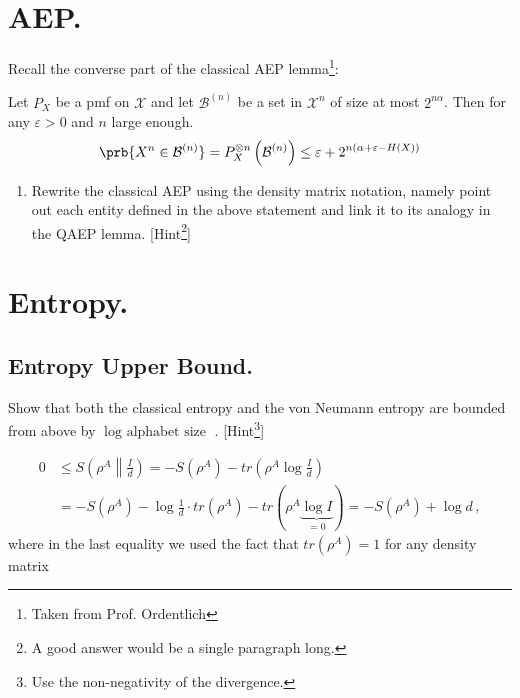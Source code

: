 \documentclass[12pt,a4paper]{article}
\begin{document}
\section{AEP.}
Recall the converse part of the classical AEP lemma\footnote{Taken from Prof. Ordentlich}:
\begin{lemma}
  Let $P_X$ be a pmf on $\mathcal{X}$ and let $\mathcal{B}^{(n)}$ be a set in $\mathcal{X}^n$ of size at most $2^{n\alpha}$. Then for any $\varepsilon > 0$ and $n$ large enough. 
  \begin{equation*}
    \begin{split}
      \prb{X^n \in \mathcal{B}^{(n)}} = P^{\otimes n}_{X}\left( \mathcal{B}^{(n)} \right) \le \varepsilon + 2^{n(\alpha + \varepsilon - H(X))}
    \end{split}
  \end{equation*}
\end{lemma}
\begin{enumerate} 
  \item Rewrite the classical AEP using the density matrix notation, namely point out each entity defined in the above statement and link it to its analogy in the QAEP lemma. [Hint\footnote{A good answer would be a single paragraph long.}]
\end{enumerate}


\section{Entropy.}

\subsection{Entropy Upper Bound. } 
Show that both the classical entropy and the von Neumann entropy are bounded from above by $\log \text{ alphabet size }$. [Hint\footnote{Use the non-negativity of the divergence.}]

     \begin{align*}
        0 &\leq S \left( \rho^A \middle\| \frac{I}{d} \right) = - S(\rho^A) - tr \left( \rho^A \log \frac{I}{d} \right) \\
        &= -S(\rho^A) - \log\frac{1}{d} \cdot tr(\rho^A) - tr(\rho^A \underbrace{\log I}_{=0})
        = -S(\rho^A) + \log d \,,
    \end{align*}
    where in the last equality we used the fact that $tr(\rho^A) = 1$ for any density matrix
\end{document}
